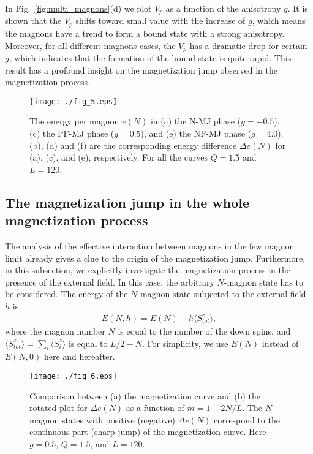 \documentclass[article,10pt,onecolumn,superscriptaddress,floatfix]{revtex4}
\begin{document}
In Fig.~{\ref{fig:multi_magnons}}(d) we plot $V_{p}$ as a function of the anisotropy $g$. It is shown that the $V_{p}$ shifts toward small value with the increase of $g$, which means the magnons have a trend to form a bound state with a strong anisotropy. Moreover, for all different magnons cases, the $V_{p}$ has a dramatic drop for certain $g$, which indicates that the formation of the bound state is quite rapid. This result has a profound insight on the magnetization jump observed in the magnetization process.
\begin{figure}[!tb] %
	\centering
	\texttt{[image: ./fig\_5.eps]}
	\caption{The energy per magnon $e(N)$ in (a) the N-MJ phase ($g=-0.5$), (c) the PF-MJ phase ($g=0.5$), and (e) the NF-MJ phase ($g=4.0$). (b), (d) and (f) are the corresponding energy difference $\Delta e(N)$ for (a), (c), and (e), respectively. For all the curves $Q=1.5$ and $L=120$.}
	\label{fig:energy_per_magnon}
\end{figure}

\subsection{The magnetization jump in the whole magnetization process}
The analysis of the effective interaction between magnons in the few magnon limit already gives a clue to the origin of the magnetization jump. Furthermore, in this subsection, we explicitly investigate the magnetization process in the presence of the external field. In this case, the arbitrary $N$-magnon state has to be considered. The energy of the $N$-magnon state subjected to the external field $h$ is
\begin{eqnarray}
E(N,h)=E(N)-h\langle S^z_{tot}\rangle,
\label{energy_in_field}
\end{eqnarray}
where the magnon number $N$ is equal to the number of the down spins, and $\langle S^z_{tot}\rangle=\sum_i \langle S^z_i\rangle$ is equal to $L/2-N$.
For simplicity, we use $E(N)$ instead of $E(N,0)$ here and hereafter.


\begin{figure}[!tb] %
	\centering
	\texttt{[image: ./fig\_6.eps]}
	\caption{Comparison between (a) the magnetization curve and (b) the rotated plot for $\Delta e(N)$ as a function of $m=1-2N/L$. The $N$-magnon states with positive (negative) $\Delta e(N)$ correspond to the continuous part (sharp jump) of the magnetization curve. Here $g=0.5$, $Q=1.5$, and $L=120$.}
	\label{fig:comparison}
\end{figure}
\end{document}
